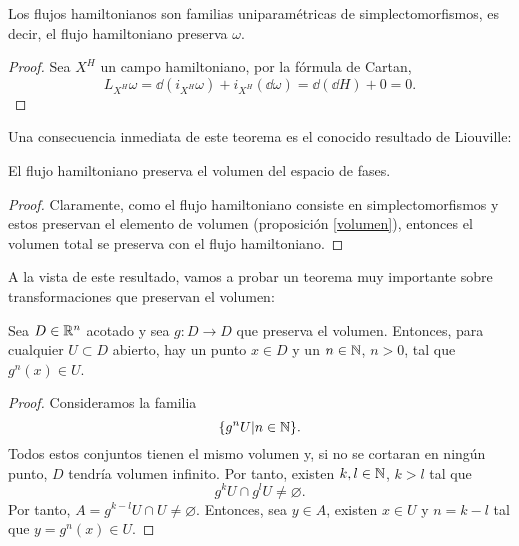 \begin{prop}
  Los flujos hamiltonianos son familias uniparamétricas de simplectomorfismos, es decir, el flujo hamiltoniano preserva $\omega$.
\end{prop}
\begin{proof}
  Sea $X^H$ un campo hamiltoniano, por la fórmula de Cartan,
  \begin{equation*}
    L_{X^H}\omega= \dd (i_{X^H}\omega) + i_{X^H}(\dd \omega) = \dd (\dd H) + 0 = 0.
  \end{equation*}
\end{proof}
Una consecuencia inmediata de este teorema es el conocido resultado de Liouville:
\begin{corol}
  El flujo hamiltoniano preserva el volumen del espacio de fases.
\end{corol}
\begin{proof}
  Claramente, como el flujo hamiltoniano consiste en simplectomorfismos y estos preservan el elemento de volumen (proposición \ref{volumen}), entonces el volumen total se preserva con el flujo hamiltoniano.
\end{proof}
A la vista de este resultado, vamos a probar un teorema muy importante sobre transformaciones que preservan el volumen:
\begin{prop}
 Sea $D\in \mathbb{R}^n$ acotado y sea $g:D\rightarrow D$ que preserva el volumen. Entonces, para cualquier $U\subset D$ abierto, hay un punto $x\in D$ y un $n\in \mathbb{N}$, $n>0$, tal que $g^n(x) \in U$.
\end{prop}
\begin{proof}
  Consideramos la familia
  \begin{equation*}
    \{g^nU | n \in \mathbb{N} \}.
  \end{equation*}
  Todos estos conjuntos tienen el mismo volumen y, si no se cortaran en ningún punto, $D$ tendría volumen infinito. Por tanto, existen $k,l\in \mathbb{N}$, $k>l$ tal que
  \begin{equation*}
    g^kU\cap g^lU \neq \varnothing.
  \end{equation*}
  Por tanto, $A=g^{k-l}U \cap U \neq \varnothing$. Entonces, sea $y\in A$, existen $x \in U$ y $n=k-l$ tal que $y=g^n(x)\in U$.
\end{proof}
